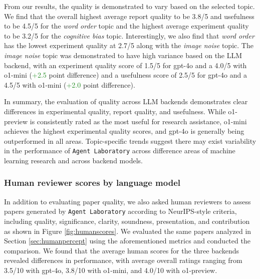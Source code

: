 \documentclass[11pt, a4paper]{gdm_format}
\begin{document}
From our results, the quality is demonstrated to vary based on the selected topic. We find that the overall highest average report quality to be 3.8/5 and usefulness to be 4.5/5 for the \textit{word order} topic and the highest average experiment quality to be 3.2/5 for the \textit{cognitive bias} topic. Interestingly, we also find that \textit{word order} has the lowest experiment quality at 2.7/5 along with the \textit{image noise} topic. The \textit{image noise} topic was demonstrated to have high variance based on the LLM backend, with an experiment quality score of 1.5/5 for gpt-4o and a 4.0/5 with o1-mini (\textcolor{ForestGreen}{+2.5} point difference) and a usefulness score of 2.5/5 for gpt-4o and a 4.5/5 with o1-mini (\textcolor{ForestGreen}{+2.0} point difference).

In summary, the evaluation of quality across LLM backends demonstrates clear differences in experimental quality, report quality, and usefulness. While o1-preview is consistently rated as the most useful for research assistance, o1-mini achieves the highest experimental quality scores, and gpt-4o is generally being outperformed in all areas. Topic-specific trends suggest there may exist variability in the performance of \texttt{Agent Laboratory} across difference areas of machine learning research and across backend models.





\subsubsection{Human reviewer scores by language model}
\label{sec:humanrevscores}


In addition to evaluating paper quality, we also asked human reviewers to assess papers generated by \texttt{Agent Laboratory} according to NeurIPS-style criteria, including quality, significance, clarity, soundness, presentation, and contribution as shown in Figure \ref{fig:humanscores}. We evaluated the same papers analyzed in Section \ref{sec:humanpercept} using the aforementioned metrics and conducted the comparison. We found that the average human scores for the three backends revealed differences in performance, with average overall ratings ranging from 3.5/10 with gpt-4o, 3.8/10 with o1-mini, and 4.0/10 with o1-preview.
\end{document}
